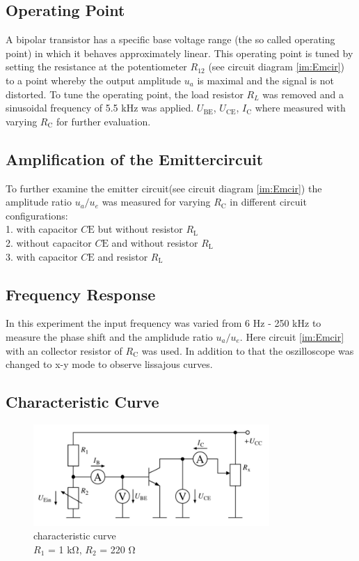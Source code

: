 \documentclass[11pt, a4paper]{article}
\begin{document}
\FloatBarrier
\subsection{Operating Point}
A bipolar transistor has a specific base voltage range (the so called operating point) in which it behaves approximately linear. This operating point
is tuned by setting the resistance at the potentiometer $R_{12}$ (see circuit diagram \ref{im:Emcir}) to a point whereby the output amplitude $u_a$ is maximal and the signal is not distorted.
To tune the operating point, the load resistor $R_L$ was removed and a sinusoidal frequency of 5.5 \si{\kilo\hertz} was applied. 
$U_{\text{BE}}$, $U_{\text{CE}}$, $I_{\text{C}}$ where measured with varying $R_{\text{C}}$ for further evaluation.
\FloatBarrier
\subsection{Amplification of the Emittercircuit}
To further examine the emitter circuit(see circuit diagram  \ref{im:Emcir}) the amplitude ratio $u_a / u_e$ was measured for varying $R_{\text{C}}$ in different circuit configurations:\\
1. with capacitor $C{\text{E}}$ but without resistor $R_{\text{L}}$ \\
2. without capacitor $C{\text{E}}$ and without resistor $R_{\text{L}}$ \\
3. with capacitor $C{\text{E}}$ and resistor $R_{\text{L}}$
\FloatBarrier
\subsection{Frequency Response}
In this experiment the input frequency was varied from 6 \si{\hertz} - 250 \si{\kilo\hertz} to measure the phase shift and the amplidude ratio $u_a / u_e$. 
Here circuit \ref{im:Emcir} with an collector resistor of $R_{\text{C}}$ was used. In addition to that the oszilloscope was changed to x-y mode to observe lissajous curves.
\FloatBarrier
\subsection{Characteristic Curve}
\begin{figure}[h]
    \centering
    \includegraphics[width=0.8\textwidth]{bilder/characteristicCurve.png}
    \caption{characteristic curve \\
    $R_1$ = 1 \si{\kilo\ohm}, $R_2$ = 220 \si{\ohm}}
    \label{im:Charcurcir}
\end{figure}
\end{document}
